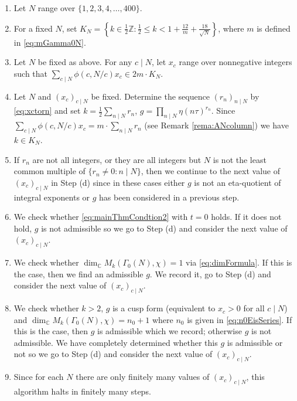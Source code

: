 \documentclass[12pt]{amsart}
\numberwithin{equation}{section}
\theoremstyle{plain}
\theoremstyle{definition}
\theoremstyle{remark}
\newcommand\numZ{\mathbb{Z}}
\newcommand\numC{\mathbb{C}}
\begin{document}
\begin{enumerate}
  \item Let $N$ range over $\{1,2,3,4,\dots,400\}$. %
  \item For a fixed $N$, set $K_N=\left\{k\in\frac{1}{2}\numZ\colon\frac{1}{2}\leq k<1+\frac{12}{m}+\frac{18}{\sqrt{N}}\right\}$, where $m$ is defined in \eqref{eq:mGamma0N}. %
  \item Let $N$ be fixed as above. For any $c\mid N$, let $x_c$ range over nonnegative integers such that $\sum_{c\mid N}\phi(c,N/c)x_c\in2m\cdot K_N$.
  \item Let $N$ and $(x_c)_{c\mid N}$ be fixed. Determine the sequence $(r_n)_{n\mid N}$ by \eqref{eq:xctorn} and set $k=\frac{1}{2}\sum_{n\mid N}r_n$, $g=\prod_{n\mid N}\eta(n\tau)^{r_n}$. Since $\sum_{c\mid N}\phi(c,N/c)x_c=m\cdot\sum_{n\mid N}r_n$ (see Remark \ref{rema:ANcolumn}) we have $k\in K_N$.
  \item If $r_n$ are not all integers, or they are all integers but $N$ is not the least common multiple of $\{r_n\neq 0\colon n\mid N\}$, then we continue to the next value of $(x_c)_{c\mid N}$ in Step (d) since in these cases either $g$ is not an eta-quotient of integral exponents or $g$ has been considered in a previous step.
  \item We check whether \eqref{eq:mainThmCondtion2} with $t=0$ holds. If it does not hold, $g$ is not admissible so we go to Step (d) and consider the next value of $(x_c)_{c\mid N}$.
  \item We check whether $\dim_\numC M_k(\Gamma_0(N), \chi)=1$ via \eqref{eq:dimFormula}. If this is the case, then we find an admissible $g$. We record it, go to Step (d) and consider the next value of $(x_c)_{c\mid N}$.
  \item We check whether $k>2$, $g$ is a cusp form (equivalent to $x_c>0$ for all $c\mid N$) and $\dim_\numC M_k(\Gamma_0(N), \chi)=n_0+1$ where $n_0$ is given in \eqref{eq:n0EisSeries}. If this is the case, then $g$ is admissible which we record; otherwise $g$ is not admissible. We have completely determined whether this $g$ is admissible or not so we go to Step (d) and consider the next value of $(x_c)_{c\mid N}$.
  \item Since for each $N$ there are only finitely many values of $(x_c)_{c\mid N}$, this algorithm halts in finitely many steps.
\end{enumerate}
\end{document}
